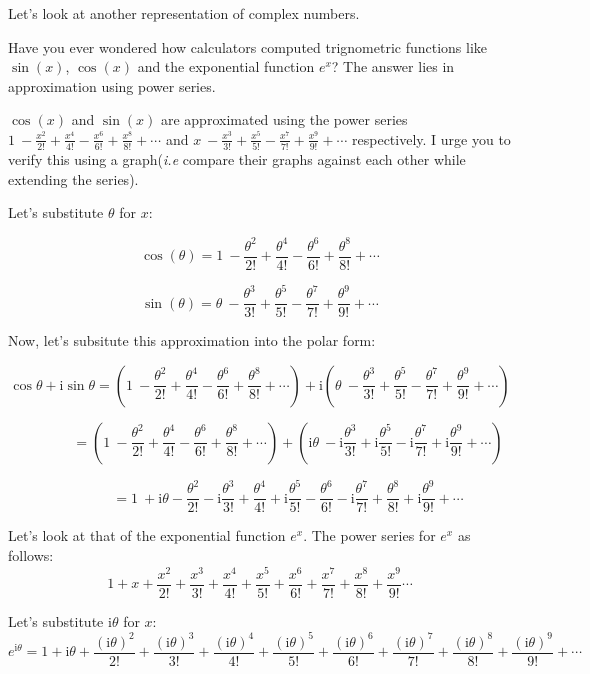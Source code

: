\documentclass[11pt]{article}
\begin{document}
    Let's look at another representation of complex numbers.

Have you ever wondered how calculators computed trignometric functions
like \(\sin(x)\), \(\cos(x)\) and the exponential function \(e^x\)? The
answer lies in approximation using power series.

\(\cos(x)\) and \(\sin(x)\) are approximated using the power series
\(1\ -\frac{x^{2}}{2!} + \frac{x^{4}}{4!} - \frac{x^{6}}{6!} + \frac{x^{8}}{8!} + \cdots\)
and
\(x\ -\frac{x^{3}}{3!} + \frac{x^{5}}{5!} - \frac{x^{7}}{7!} + \frac{x^{9}}{9!} + \cdots\)
respectively. I urge you to verify this using a graph(\emph{i.e} compare
their graphs against each other while extending the series).

Let's substitute \(\theta\) for \(x\):

\[\cos(\theta) = 1\ - \frac{\theta^{2}}{2!} + \frac{\theta^{4}}{4!} - \frac{\theta^{6}}{6!} + \frac{\theta^{8}}{8!} + \cdots\]

\[\sin(\theta) = \theta\ - \frac{\theta^{3}}{3!} + \frac{\theta^{5}}{5!} - \frac{\theta^{7}}{7!} + \frac{\theta^{9}}{9!} + \cdots\]

Now, let's subsitute this approximation into the polar form:

\[\cos\theta + \mathrm{i}\sin\theta = (1\ - \frac{\theta^{2}}{2!} + \frac{\theta^{4}}{4!} - \frac{\theta^{6}}{6!} + \frac{\theta^{8}}{8!} + \cdots) + \mathrm{i}(\theta\ - \frac{\theta^{3}}{3!} + \frac{\theta^{5}}{5!} - \frac{\theta^{7}}{7!} + \frac{\theta^{9}}{9!} + \cdots)\]

\[ \qquad  \qquad  = (1\ - \frac{\theta^{2}}{2!} + \frac{\theta^{4}}{4!} - \frac{\theta^{6}}{6!} + \frac{\theta^{8}}{8!} + \cdots) + (\mathrm{i}\theta\ - \mathrm{i}\frac{\theta^{3}}{3!} + \mathrm{i}\frac{\theta^{5}}{5!} - \mathrm{i}\frac{\theta^{7}}{7!} + \mathrm{i}\frac{\theta^{9}}{9!} + \cdots)\]

\[ \qquad  \qquad  = 1\ + \mathrm{i}\theta - \frac{\theta^{2}}{2!} - \mathrm{i}\frac{\theta^{3}}{3!} + \frac{\theta^{4}}{4!} + \mathrm{i}\frac{\theta^{5}}{5!} - \frac{\theta^{6}}{6!} - \mathrm{i}\frac{\theta^{7}}{7!} + \frac{\theta^{8}}{8!} + \mathrm{i}\frac{\theta^{9}}{9!} + \cdots\]

Let's look at that of the exponential function \(e^x\). The power series
for \(e^x\) as follows:
\[1 + x + \frac{x^2}{2!} + \frac{x^3}{3!} + \frac{x^4}{4!} + \frac{x^5}{5!} + \frac{x^6}{6!} + \frac{x^7}{7!} + \frac{x^8}{8!} + \frac{x^9}{9!} \cdots\]

Let's substitute \(\mathrm{i}\theta\) for \(x\):
\[ e^{\mathrm{i}\theta} = 1 + \mathrm{i}\theta + \frac{(\mathrm{i}\theta)^2}{2!} + \frac{(\mathrm{i}\theta)^3}{3!} + \frac{(\mathrm{i}\theta)^4}{4!} + \frac{(\mathrm{i}\theta)^5}{5!} + \frac{(\mathrm{i}\theta)^6}{6!} + \frac{(\mathrm{i}\theta)^7}{7!} + \frac{(\mathrm{i}\theta)^8}{8!} + \frac{(\mathrm{i}\theta)^9}{9!} + \cdots\]
\end{document}
